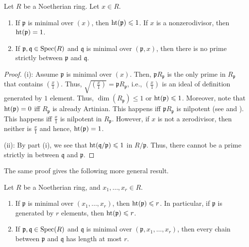 \documentclass[12pt]{article}
\begin{document}
\begin{prop}
	Let $R$ be a Noetherian ring. Let $x \in R$.
	\begin{enumerate}[label=(\roman*)]
		\item If $\mathfrak{p}$ is minimal over $(x)$, then $\operatorname{ht}(\mathfrak{p}) \leqslant 1$. If $x$ is a nonzerodivisor, then $\operatorname{ht}(\mathfrak{p}) = 1$.
		\item If $\mathfrak{p}, \mathfrak{q} \in \operatorname{Spec}(R)$ and $\mathfrak{q}$ is minimal over $(\mathfrak{p}, x)$, then there is no prime strictly between $\mathfrak{p}$ and $\mathfrak{q}$.
	\end{enumerate}
\end{prop}
\begin{proof} 
	(i): Assume $\mathfrak{p}$ is minimal over $(x)$. Then, $\mathfrak{p} R_{\mathfrak{p}}$ is the only prime in $R_{\mathfrak{p}}$ that contains $(\frac{x}{1})$. Thus, $\sqrt{(\frac{x}{1})} = \mathfrak{p} R_{\mathfrak{p}}$, i.e., $(\frac{x}{1})$ is an ideal of definition generated by $1$ element. Thus, $\dim(R_{\mathfrak{p}}) \le 1$ or $\operatorname{ht}(\mathfrak{p}) \leqslant 1$. \newline
	Moreover, note that $\operatorname{ht}(\mathfrak{p}) = 0$ iff $R_{\mathfrak{p}}$ is already Artinian. This happens iff $\mathfrak{p} R_{\mathfrak{p}}$ is nilpotent (see  and ). This happens iff $\frac{x}{1}$ is nilpotent in $R_{\mathfrak{p}}$. \newline
	However, if $x$ is not a zerodivisor, then neither is $\frac{x}{1}$ and hence, $\operatorname{ht}(\mathfrak{p}) = 1$. 

	(ii): By part (i), we see that $\operatorname{ht}(\mathfrak{q}/\mathfrak{p}) \leqslant 1$ in $R/\mathfrak{p}$. Thus, there cannot be a prime strictly in between $\mathfrak{q}$ and $\mathfrak{p}$.
\end{proof}

The same proof gives the following more general result.

\begin{prop}
	Let $R$ be a Noetherian ring, and $x_{1}, \ldots, x_{r} \in R$.
	\begin{enumerate}
		\item If $\mathfrak{p}$ is minimal over $(x_{1}, \ldots, x_{r})$, then $\operatorname{ht}(\mathfrak{p}) \leqslant r$. \newline
		In particular, if $\mathfrak{p}$ is generated by $r$ elements, then $\operatorname{ht}(\mathfrak{p}) \leqslant r$.
		\item If $\mathfrak{p}, \mathfrak{q} \in \operatorname{Spec}(R)$ and $\mathfrak{q}$ is minimal over $(\mathfrak{p}, x_{1}, \ldots, x_{r})$, then every chain between $\mathfrak{p}$ and $\mathfrak{q}$ has length at most $r$.
	\end{enumerate}
\end{prop}
\end{document}
